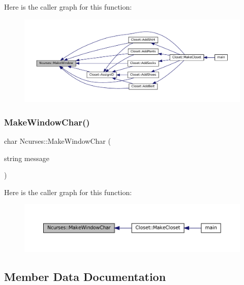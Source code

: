 Here is the caller graph for this function\+:\nopagebreak
\begin{figure}[H]
\begin{center}
\leavevmode
\includegraphics[width=350pt]{classNcurses_a1d8def11419a444c5696b5043da680d4_icgraph}
\end{center}
\end{figure}
\mbox{\label{classNcurses_a2b4916627ad802a840b95cf65766773f}} 
\subsubsection{\texorpdfstring{Make\+Window\+Char()}{MakeWindowChar()}}
{\footnotesize\ttfamily char Ncurses\+::\+Make\+Window\+Char (\begin{DoxyParamCaption}\item[{string}]{message }\end{DoxyParamCaption})}

Here is the caller graph for this function\+:\nopagebreak
\begin{figure}[H]
\begin{center}
\leavevmode
\includegraphics[width=350pt]{classNcurses_a2b4916627ad802a840b95cf65766773f_icgraph}
\end{center}
\end{figure}


\subsection{Member Data Documentation}
\mbox{\label{classNcurses_adce6b18f601709b3843fb36fa7b91764}} 
